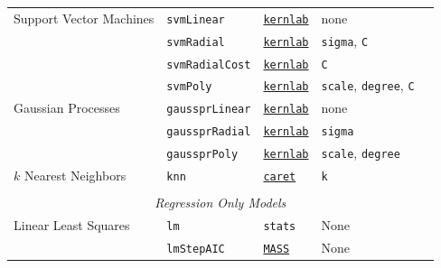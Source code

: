 \documentclass[12pt]{article}
\newcommand{\code}[1]{\mbox{\footnotesize\color{darkblue}\texttt{#1}}}
\begin{document}
\begin{landscape}
\begin{longtable}{lllll}
     Support Vector Machines  &
         \code{svmLinear} & 
             {\tt \href{http://cran.r-project.org/web/packages/kernlab/index.html}{kernlab}}       & 
            none & \\              
 &
         \code{svmRadial} & 
            {\tt \href{http://cran.r-project.org/web/packages/kernlab/index.html}{kernlab}}      & 
            \code{sigma}, \code{C} & \\             
 &
         \code{svmRadialCost} & 
            {\tt \href{http://cran.r-project.org/web/packages/kernlab/index.html}{kernlab}}      & 
            \code{C} & \\   
 &
         \code{svmPoly} & 
            {\tt \href{http://cran.r-project.org/web/packages/kernlab/index.html}{kernlab}}      & 
            \code{scale}, \code{degree}, \code{C} & \\            

\rowcolor[rgb]{.95, .95, .95}   
           Gaussian Processes  &
         \code{gaussprLinear} & 
            {\tt \href{http://cran.r-project.org/web/packages/kernlab/index.html}{kernlab}}      & 
            none & \\             
\rowcolor[rgb]{.95, .95, .95}                          
  &
         \code{gaussprRadial} & 
             {\tt \href{http://cran.r-project.org/web/packages/kernlab/index.html}{kernlab}}        & 
            \code{sigma} & \\              

\rowcolor[rgb]{.95, .95, .95}             
  &
         \code{gaussprPoly} & 
             {\tt \href{http://cran.r-project.org/web/packages/kernlab/index.html}{kernlab}}       & 
            \code{scale}, \code{degree} & \\            

     $k$ Nearest Neighbors &
         \code{knn} & 
             {\tt \href{http://cran.r-project.org/web/packages/caret/index.html}{caret}}       & 
            \code{k} & \\   
      
      \\
\multicolumn{5}{c}{{{ \em Regression Only Models}}} \\      
    
\rowcolor[rgb]{.95, .95, .95}             
      Linear Least Squares &
         \code{lm} & 
            \code{stats}       & 
            None & \\  
            
\rowcolor[rgb]{.95, .95, .95}                     
            &
         \code{lmStepAIC} & 
             {\tt \href{http://cran.r-project.org/web/packages/MASS/index.html}{MASS}}       & 
            None & \\  
            

\end{longtable}
\end{landscape}
\end{document}
